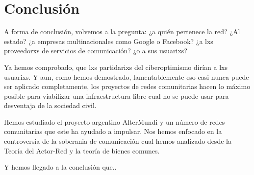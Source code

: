 \section{Conclusión}

A forma de conclusión, volvemos a la pregunta: ¿a quién pertenece la red?
¿Al estado? ¿a empresas multinacionales como Google o Facebook? ¿a lxs proveedorxs de servicios de comunicación? ¿o a sus usuarixs?

Ya hemos comprobado, que lxs partidarixs del ciberoptimismo dirían a lxs usuarixs.
Y aun, como hemos demostrado, lamentablemente eso casi nunca puede ser aplicado completamente, los proyectos de redes comunitarias hacen lo máximo posible para viabilizar una infraestructura libre cual no se puede usar para desventaja de la sociedad civil.

Hemos estudiado el proyecto argentino AlterMundi y un número de redes comunitarias que este ha ayudado a impulsar.
Nos hemos enfocado en la controversia de la soberania de comunicación cual hemos analizado desde la Teoría del Actor-Red y la teoría de bienes comunes.

Y hemos llegado a la conclusión que..

\begin{comment}
[PHPHLT2016]
"As new technologies offer new ways of engaging with emergent research
environments, our actual practices as ethnographers also shift." --> man kann darüber meta reflektieren, welche konsequenzen das für meine arbeit hat

"how inequality is extended, reproduced or complicated by digital media technologies" --> kann leider nicht befriedigend beurteilen aus der ferne, aber ich würde eher für das gegenteil argumentieren beim projekt: es ist ein versuch, the digital devide zu schließen (bridging the digital devide);
\end{comment}
